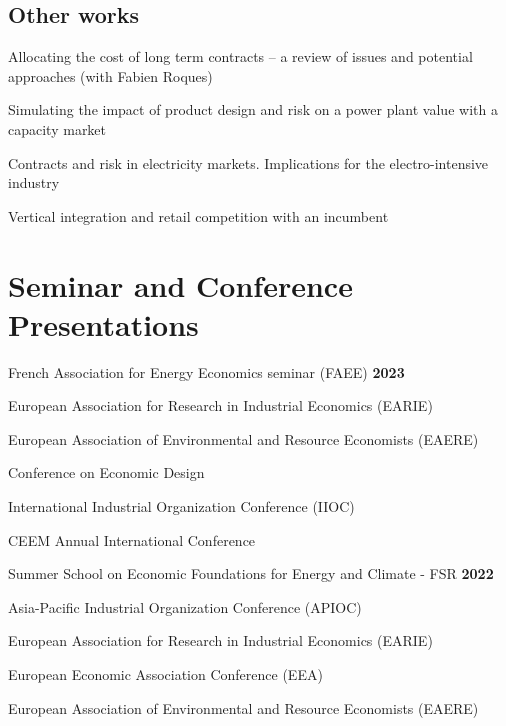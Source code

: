 \documentclass[letterpaper]{article}
\renewenvironment{itemize}{
  \begin{list}{}{
    \setlength{\leftmargin}{1.5em}
  }
}{
  \end{list}
}
\begin{document}
\subsection*{Other works}

\begin{itemize}
\item Allocating the cost of long term contracts – a review of issues and potential approaches (with Fabien Roques)
\item Simulating the impact of product design and risk on a power plant value with a capacity market
\item Contracts and risk in electricity markets. Implications for the electro-intensive industry
\item Vertical integration and retail competition with an incumbent
\end{itemize}


\section*{\textbf{Seminar and Conference Presentations}}
 
 \/



French Association for Energy Economics seminar (FAEE) \hfill \hfill \textbf{2023}



European Association for Research in Industrial Economics (EARIE)

European Association of Environmental and Resource Economists (EAERE)

Conference on Economic Design

International Industrial Organization Conference (IIOC)

CEEM Annual International Conference


\vspace{0.5cm}

Summer School on Economic Foundations for Energy and Climate - FSR \hfill \hfill  \textbf{2022}

Asia-Pacific Industrial Organization Conference (APIOC)

European Association for Research in Industrial Economics (EARIE)

European Economic Association Conference (EEA)

European Association of Environmental and Resource Economists (EAERE)

\vspace{0.5cm}
\end{document}
